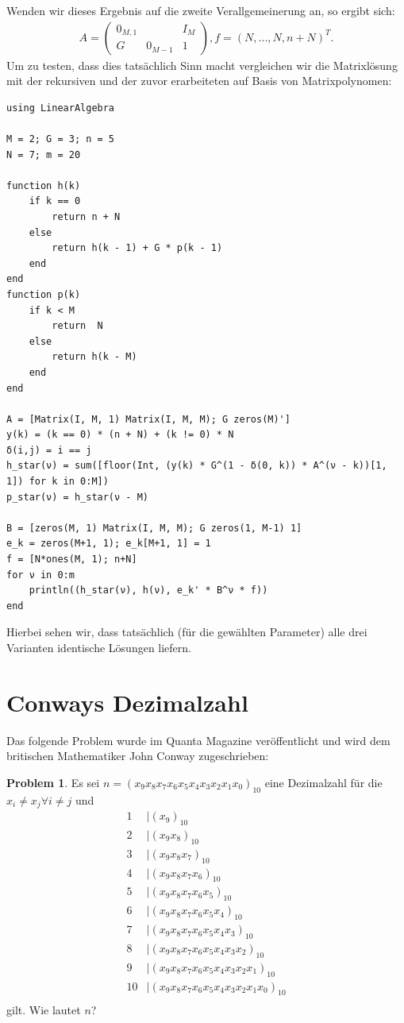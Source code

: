 \documentclass{article}
\theoremstyle{plain} %
\theoremstyle{definition} %
\newtheorem{problem}[theorem]{Problem}
\begin{document}
Wenden wir dieses Ergebnis auf die zweite Verallgemeinerung an, so ergibt sich:
\begin{align*}
  A = \begin{pmatrix}
    0_{M, 1} &         & I_{M} \\
    G        & 0_{M-1} & 1
  \end{pmatrix}, f=(N,...,N, n+N)^T.
\end{align*}
Um zu testen, dass dies tatsächlich Sinn macht vergleichen wir die Matrixlösung mit der rekursiven und der zuvor erarbeiteten auf Basis von Matrixpolynomen:

\begin{verbatim}
using LinearAlgebra

M = 2; G = 3; n = 5
N = 7; m = 20

function h(k)
    if k == 0
        return n + N
    else
        return h(k - 1) + G * p(k - 1)
    end
end
function p(k)
    if k < M
        return  N
    else
        return h(k - M)
    end
end

A = [Matrix(I, M, 1) Matrix(I, M, M); G zeros(M)']
y(k) = (k == 0) * (n + N) + (k != 0) * N
δ(i,j) = i == j
h_star(ν) = sum([floor(Int, (y(k) * G^(1 - δ(0, k)) * A^(ν - k))[1, 1]) for k in 0:M])
p_star(ν) = h_star(ν - M)

B = [zeros(M, 1) Matrix(I, M, M); G zeros(1, M-1) 1]
e_k = zeros(M+1, 1); e_k[M+1, 1] = 1
f = [N*ones(M, 1); n+N]
for ν in 0:m
    println((h_star(ν), h(ν), e_k' * B^ν * f))
end
\end{verbatim}

Hierbei sehen wir, dass tatsächlich (für die gewählten Parameter) alle drei Varianten identische Lösungen liefern.

\section{Conways Dezimalzahl}
Das folgende Problem wurde im Quanta Magazine\cite{QuantaConway} veröffentlicht und wird dem britischen Mathematiker John Conway zugeschrieben:
\begin{problem}
Es sei $n = (x_9x_8x_7x_6x_5x_4x_3x_2x_1x_0)_{10}$ eine Dezimalzahl für die $x_i \neq x_j \forall i \neq j$ und
\begin{align*}
  1  & | (x_9         )_{10}                   \\
  2  & | (x_9x_8        )_{10}                 \\
  3  & | (x_9x_8x_7       )_{10}               \\
  4  & | (x_9x_8x_7x_6     )_{10}              \\
  5  & | (x_9x_8x_7x_6x_5     )_{10}           \\
  6  & | (x_9x_8x_7x_6x_5x_4    )_{10}         \\
  7  & | (x_9x_8x_7x_6x_5x_4x_3   )_{10}       \\
  8  & | (x_9x_8x_7x_6x_5x_4x_3x_2  )_{10}     \\
  9  & | (x_9x_8x_7x_6x_5x_4x_3x_2x_1 )_{10}   \\
  10 & | (x_9x_8x_7x_6x_5x_4x_3x_2x_1x_0)_{10} \\
\end{align*}
gilt. Wie lautet $n$?
\end{problem}
\end{document}
